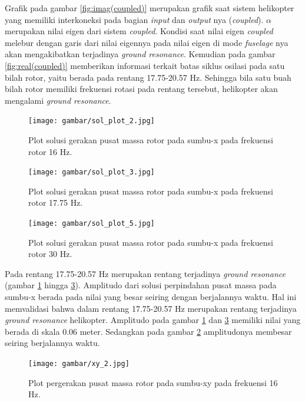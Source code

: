 Grafik pada gambar \ref{fig:imag(coupled)} merupakan grafik saat sistem helikopter yang memiliki interkoneksi pada bagian \textit{input} dan \textit{output} nya (\textit{coupled}). $\alpha$ merupakan nilai eigen dari sistem \textit{coupled}. Kondisi saat nilai eigen \textit{coupled} melebur dengan garis dari nilai eigennya pada nilai eigen di mode \textit{fuselage} nya akan mengakibatkan terjadinya \textit{ground resonance}. Kemudian pada gambar \ref{fig:real(coupled)} memberikan informasi terkait batas siklus osilasi pada satu bilah rotor, yaitu berada pada rentang 17.75-20.57 Hz. Sehingga bila satu buah bilah rotor memiliki frekuensi rotasi pada rentang tersebut, helikopter akan mengalami \textit{ground resonance}.

\begin{figure}[H]
	\centering
	\texttt{[image: gambar/sol\_plot\_2.jpg]}
	\caption{Plot solusi gerakan pusat massa rotor pada sumbu-x pada frekuensi rotor 16 Hz.}
	\label{fig:sol_plot_2}
\end{figure}

\begin{figure}[H]
	\centering
	\texttt{[image: gambar/sol\_plot\_3.jpg]}
	\caption{Plot solusi gerakan pusat massa rotor pada sumbu-x pada frekuensi rotor 17.75 Hz.}
	\label{fig:sol_plot_3}
\end{figure}

\begin{figure}[H]
	\centering
	\texttt{[image: gambar/sol\_plot\_5.jpg]}
	\caption{Plot solusi gerakan pusat massa rotor pada sumbu-x pada frekuensi rotor 30 Hz.}
	\label{fig:sol_plot_5}
\end{figure}

Pada rentang 17.75-20.57 Hz merupakan rentang terjadinya \textit{ground resonance} (gambar \ref{fig:sol_plot_2} hingga \ref{fig:sol_plot_5}). Amplitudo dari solusi perpindahan pusat massa pada sumbu-x berada pada nilai yang besar seiring dengan berjalannya waktu. Hal ini memvalidasi bahwa dalam rentang 17.75-20.57 Hz merupakan rentang terjadinya \textit{ground resonance} helikopter. Amplitudo pada gambar \ref{fig:sol_plot_2} dan \ref{fig:sol_plot_5} memiliki nilai yang berada di skala 0.06 meter. Sedangkan pada gambar \ref{fig:sol_plot_3} amplitudonya membesar seiring berjalannya waktu. 

\begin{figure}[H]
	\centering
	\texttt{[image: gambar/xy\_2.jpg]}
	\caption{Plot pergerakan pusat massa rotor pada sumbu-xy pada frekuensi 16 Hz.}
	\label{fig:xy_2}
\end{figure}

